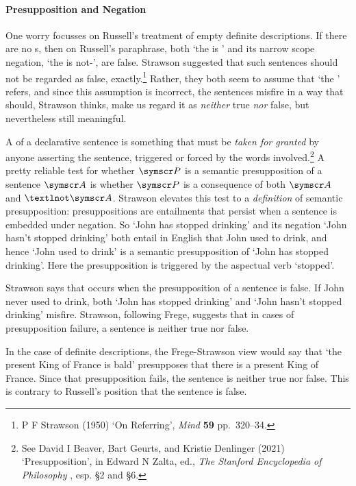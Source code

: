 \paragraph{Presupposition and Negation}
One worry focusses on Russell's treatment of empty definite descriptions. If there are no s, then on Russell's paraphrase, both `the  is ' and its narrow scope negation, `the  is not-', are false. Strawson suggested that such sentences should not be regarded as false, exactly.\footnote{P F Strawson (1950) `On Referring', \emph{Mind} \textbf{59} pp.\ 320–34.} Rather, they both seem to assume that `the ' refers, and since this assumption is incorrect, the sentences misfire in a way that should, Strawson thinks, make us regard it as \emph{neither} true \emph{nor} false, but nevertheless still meaningful.

A  of a declarative sentence is something that must be \emph{taken for granted} by anyone asserting the sentence, triggered or forced by the words involved.\footnote{See David I Beaver, Bart Geurts, and Kristie Denlinger (2021) `Presupposition', in Edward N Zalta, ed., \emph{The Stanford Encyclopedia of Philosophy} , esp. §2 and §6.} A pretty reliable test for whether $\meta{P}$ is a semantic presupposition of a sentence $\meta{A}$ is whether $\meta{P}$ is a consequence of both $\meta{A}$ and $¬\meta{A}$. Strawson elevates this test to a \emph{definition} of semantic presupposition: presuppositions are entailments that persist when a sentence is embedded under negation.  So `John has stopped drinking' and its negation `John hasn't stopped drinking' both entail in English that John used to drink, and hence `John used to drink' is a semantic presupposition of `John has stopped drinking'. Here the presupposition is triggered by the aspectual verb `stopped'. 

Strawson says that  occurs when the presupposition of a sentence is false. If John never used to drink, both `John has stopped drinking' and `John hasn't stopped drinking' misfire. Strawson, following Frege, suggests that in cases of presupposition failure, a sentence is neither true nor false. 

In the case of definite descriptions, the Frege-Strawson view would say that `the present King of France is bald' presupposes that there is a present King of France. Since that presupposition fails, the sentence is neither true nor false. This is contrary to Russell's position that the sentence is false. 

